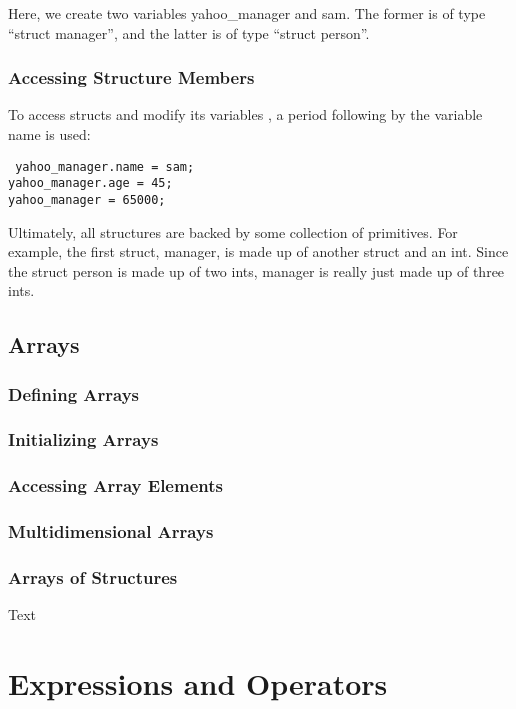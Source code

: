 \documentclass{article}
\begin{document}
Here, we create two variables yahoo\_manager and sam. The former is of type ``struct manager'', and the latter is of type ``struct person''.

\subsubsection{Accessing Structure Members}

 To access structs and modify its variables , a period following by the variable name is used:

 \begin{lstlisting}
 yahoo_manager.name = sam;
yahoo_manager.age = 45;
yahoo_manager = 65000;
\end{lstlisting}

Ultimately, all structures are backed by some collection of primitives. For example, the first struct, manager, is made up of another struct and an int. Since the struct person is made up of two ints, manager is really just made up of three ints.


\subsection{Arrays}

\subsubsection{Defining Arrays}

\subsubsection{Initializing Arrays}

\subsubsection{Accessing Array Elements}

\subsubsection{Multidimensional Arrays}

\subsubsection{Arrays of Structures}
Text

\section{Expressions and Operators}
\end{document}
